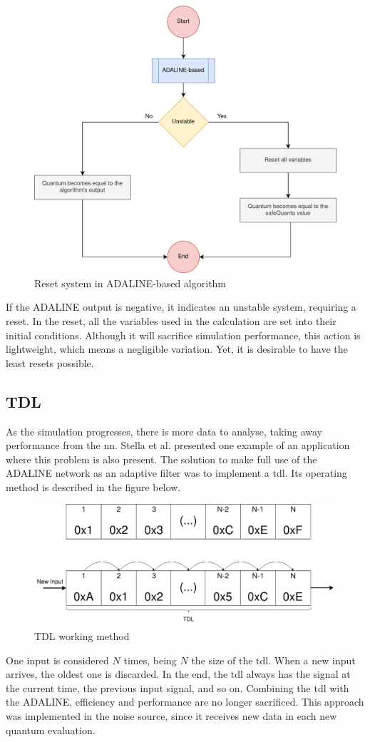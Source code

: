 \begin{figure}[H]
	\centering
 	\includegraphics[width=0.57\linewidth]{Images/ResetSystemADALINE.png}
 	\caption{Reset system in ADALINE-based algorithm}
	 \label{fig_ResetSystemADALINE}
\end{figure}

If the ADALINE output is negative, it indicates an unstable system, requiring a reset. In the reset, all the variables used in the calculation are set 
into their initial conditions. Although it will sacrifice simulation performance, this action is lightweight, which means a negligible variation. 
Yet, it is desirable to have the least resets possible.

\subsection{TDL}

As the simulation progresses, there is more data to analyse, taking away performance from the \gls{nn}. Stella et al. \cite{noiseCancelingADALINE} 
presented one example of an application where this problem is also present. The solution to make full use of the ADALINE network as an adaptive 
filter was to implement a \gls{tdl}. Its operating method is described in the figure below. 

\begin{figure}[H]
	\centering
 	\includegraphics[width=0.5\linewidth]{Images/TDL.png}
 	\caption{TDL working method}
	 \label{fig_TDL}
\end{figure}

One input is considered $N$ times, being $N$ the size of the \gls{tdl}. When a new input arrives, the oldest one is discarded. In the end, 
the \gls{tdl} always has the signal at the current time, the previous input signal, and so on. Combining the \gls{tdl} with the ADALINE, 
efficiency and performance are no longer sacrificed. This approach was implemented in the noise source, since it receives new data in each new 
quantum evaluation. 

